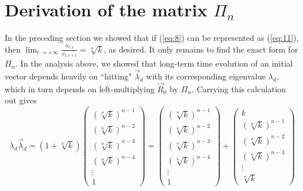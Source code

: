 \documentclass[11pt]{article}
\theoremstyle{plain}
\theoremstyle{definition}
\begin{document}
\section{Derivation of the matrix $\Pi_n$}
In the preceding section we showed that if (\ref{eq:8}) can be represented as (\ref{eq:11}), then  $\displaystyle\lim_{t\to+\infty}\frac{x_{t,i}}{x_{t,i+1}}=\sqrt[n]{k}$, as desired. It only remains to find the exact form for $\Pi_n$. In the analysis above, we showed that long-term time evolution of an initial vector depends heavily on ``hitting" $\vec{\lambda}_d$ with its corresponding eigenvalue $\lambda_d$, which in turn depends on left-multiplying $\vec{R}_0$ by $\Pi_n$. Carrying this calculation out gives $$\lambda_d \vec{\lambda}_d=\left(1+\sqrt[n]{k}\right)\left(\begin{array}{c}
{\left(\sqrt[n]{k}\right)}^{n-1} \\
{\left(\sqrt[n]{k}\right)}^{n-2} \\
{\left(\sqrt[n]{k}\right)}^{n-3} \\
{\left(\sqrt[n]{k}\right)}^{n-4} \\
\vdots \\
1\end{array}\right)
=
\left(\begin{array}{c}
{\left(\sqrt[n]{k}\right)}^{n-1} \\
{\left(\sqrt[n]{k}\right)}^{n-2} \\
{\left(\sqrt[n]{k}\right)}^{n-3} \\
{\left(\sqrt[n]{k}\right)}^{n-4} \\
\vdots \\
1\end{array}\right)
+
\left(\begin{array}{c}
k \\
{\left(\sqrt[n]{k}\right)}^{n-1} \\
{\left(\sqrt[n]{k}\right)}^{n-2} \\
{\left(\sqrt[n]{k}\right)}^{n-3} \\
\vdots \\
\sqrt[n]{k}\end{array}\right)$$
\end{document}
